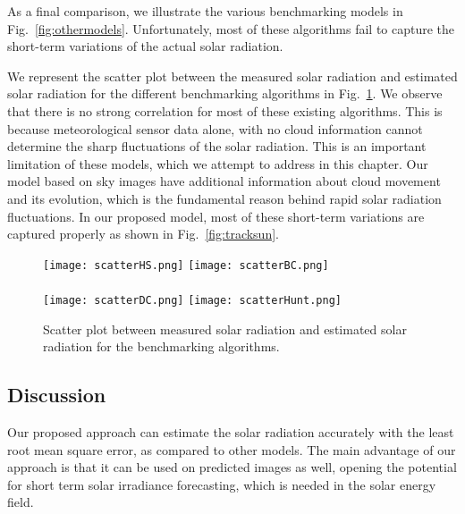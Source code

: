 As a final comparison, we illustrate the various benchmarking models in Fig.~\ref{fig:othermodels}. Unfortunately, most of these algorithms fail to capture the short-term variations of the actual solar radiation. 

We represent the scatter plot between the measured solar radiation and estimated solar radiation for the different benchmarking algorithms in Fig.~\ref{fig:scatter-other}. We observe that there is no strong correlation for most of these existing algorithms. This is because meteorological sensor data alone, with no cloud information cannot determine the sharp fluctuations of the solar radiation. 
This is an important limitation of these models, which we attempt to address in this chapter. Our model based on sky images have additional information about cloud movement and its evolution, which is the fundamental reason behind rapid solar radiation fluctuations. In our proposed model, most of these short-term variations are captured properly as shown in Fig.~\ref{fig:tracksun}.

\begin{figure}[htb]
\centering
\texttt{[image: scatterHS.png]}
\texttt{[image: scatterBC.png]}\\
\\
\texttt{[image: scatterDC.png]}
\texttt{[image: scatterHunt.png]}\\
\caption{Scatter plot between measured solar radiation and estimated solar radiation for the benchmarking algorithms. 
\label{fig:scatter-other}}
\end{figure}

\subsection{Discussion}
\label{sec:solar-discuss}
Our proposed approach can estimate the solar radiation accurately with the least root mean square error, as compared to other models. The main advantage of our approach is that it can be used on predicted images as well, opening the potential for short term solar irradiance forecasting, which is needed in the solar energy field. 

